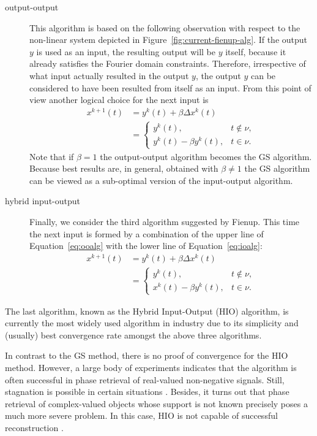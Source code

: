 \begin{description}
\item [{output-output}] This algorithm is based on the following
  observation with respect to the non-linear system depicted in
  Figure~\ref{fig:current-fienup-alg}.  If the output $y$ is used as an
  input, the resulting output will be $y$ itself, because it already
  satisfies the Fourier domain constraints.  Therefore, irrespective
  of what input actually resulted in the output $y$, the output $y$
  can be considered to have been resulted from itself as an input. From
  this point of view another logical choice for the next input is
  \begin{align}
    x^{k+1}(t) & =y^{k}(t)+\beta\Delta x^{k}(t)\nonumber \\
    & =\begin{cases}
      y^{k}(t), & t\not\in\nu,\\
      y^{k}(t)-\beta y^{k}(t), & t\in\nu.
    \end{cases}\label{eq:ooalg}
  \end{align}
  Note that if $\beta=1$ the output-output algorithm becomes the GS
  algorithm. Because best results are, in general, obtained with
  $\beta\not=1$ the GS algorithm can be viewed as a
  sub-optimal version of the input-output algorithm.
\item [{hybrid input-output}] Finally, we consider the third algorithm
  suggested by Fienup. This time the next input is formed by a
  combination of the upper line of Equation~\eqref{eq:ooalg} with the
  lower line of Equation~\eqref{eq:ioalg}:
  \begin{align}
    x^{k+1}(t) & =y^{k}(t)+\beta\Delta x^{k}(t)\nonumber \\
    & =\begin{cases}
      y^{k}(t), & t\not\in\nu,\\
      x^{k}(t)-\beta y^{k}(t), & t\in\nu.
    \end{cases}\label{eq:hioalg}
  \end{align}
\end{description}
The last algorithm, known as the Hybrid Input-Output (HIO) algorithm,
is currently the most widely used algorithm in industry due to
its simplicity and (usually) best convergence rate amongst the above
three algorithms.

In contrast to the GS method, there is no proof of convergence for the
HIO method. However, a large body of experiments indicates that the
algorithm is often successful in phase retrieval of real-valued
non-negative signals. Still, stagnation is possible in certain
situations
. Besides, it turns
out that phase retrieval of complex-valued objects whose support is
not known precisely poses a much more severe problem. In this case, HIO
is not capable of successful reconstruction
.

